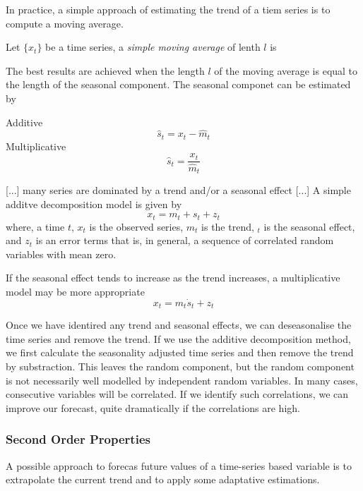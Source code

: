 In practice, a simple approach of estimating the trend of a tiem series is to compute a moving average.

\begin{definition}
    Let $\{ x_t \}$ be a time series, a \emph{simple moving average} of lenth $l$ is 
\end{definition}

The best results are achieved when the length $l$ of the moving average is equal to the length of the seasonal component. The seasonal componet can be estimated by

\begin{definition}
    Additive
    \[
        \hat{s}_t = x_t - \hat{m}_t
    \]
    Multiplicative
    \[
        \hat{s}_t = \frac{x_t}{\hat{m}_t}
    \]
\end{definition}


{\color{red} [...] many series are dominated by a trend and/or a seasonal effect [...] A simple additve decomposition model is given by
\[
    x_t = m_t + s_t + z_t
\]
where, a time $t$, $x_t$ is the observed series, $m_t$ is the trend, $_t$ is the seasonal effect, and $z_t$ is an error terms that is, in general, a sequence of correlated random variables with mean zero.

If the seasonal effect tends to increase as the trend increases, a multiplicative model may be more appropriate
\[
    x_t = m_t \dot s_t + z_t
\]

}

\begin{definition}
    
\end{definition}

{\color{red} Once we have identired any trend and seasonal effects, we can deseasonalise the time series and remove the trend. If we use the additive decomposition method, we first calculate the seasonality adjusted time series and then remove the trend by substraction. This leaves the random component, but the random component is not necessarily well modelled by independent random variables. In many cases, consecutive variables will be correlated. If we identify such correlations, we can improve our forecast, quite dramatically if the correlations are high.}

\subsubsection{Second Order Properties}

A possible approach to forecas future values of a time-series based variable is to extrapolate the current trend and to apply some adaptative estimations.


